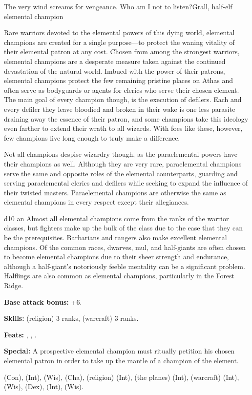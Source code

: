 {The very wind screams for vengeance. Who am I not to listen?}{Grall, half-elf elemental champion}
{Rare warriors devoted to the elemental powers of this dying world, elemental champions are created for a single purpose---to protect the waning vitality of their elemental patron at any cost. Chosen from among the strongest warriors, elemental champions are a desperate measure taken against the continued devastation of the natural world. Imbued with the power of their patrons, elemental champions protect the few remaining pristine places on Athas and often serve as bodyguards or agents for clerics who serve their chosen element. The main goal of every champion though, is the execution of defilers. Each and every defiler they leave bloodied and broken in their wake is one less parasite draining away the essence of their patron, and some champions take this ideology even farther to extend their wrath to all wizards. With foes like these, however, few champions live long enough to truly make a difference.

Not all champions despise wizardry though, as the paraelemental powers have their champions as well.
Although they are very rare, paraelemental champions serve the same and opposite roles of the elemental counterparts, guarding and serving paraelemental clerics and defilers while seeking to expand the influence of their twisted masters. Paraelemental champions are otherwise the same as elemental champions in every respect except their allegiances.}
{d10}
{an}
{Almost all elemental champions come from the ranks of the warrior classes, but fighters make up the bulk of the class due to the ease that they can be the prerequisites. Barbarians and rangers also make excellent elemental champions. Of the common races, dwarves, mul, and half-giants are often chosen to become elemental champions due to their sheer strength and endurance, although a half-giant's notoriously feeble mentality can be a significant problem. Halflings are also common as elemental champions, particularly in the Forest Ridge.}
{
\textbf{Base attack bonus:} +6.

\textbf{Skills:}  (religion) 3 ranks,  (warcraft) 3 ranks.

\textbf{Feats:} , , .

\textbf{Special:} A prospective elemental champion must ritually petition his chosen elemental patron in order to take up the mantle of a champion of the element.
}
{ (Con),  (Int),  (Wis),  (Cha),  (religion) (Int),  (the planes) (Int),  (warcraft) (Int),  (Wis),  (Dex),  (Int),  (Wis).}
